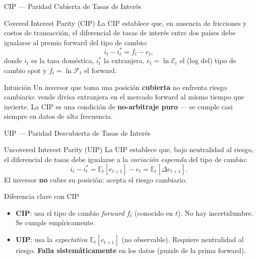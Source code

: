 
\begin{frame}{CIP — Paridad Cubierta de Tasas de Interés}

  \begin{bluebox}{Covered Interest Parity (CIP)}
    La CIP establece que, en ausencia de fricciones y costos de transacción, el
    diferencial de tasas de interés entre dos países debe igualarse al premio forward
    del tipo de cambio:
    \[
      i_t - i^*_t = f_t - e_t,
    \]
    donde $i_t$ es la tasa doméstica, $i^*_t$ la extranjera, $e_t = \ln \mathcal{E}_t$
    el (log del) tipo de cambio spot y $f_t = \ln \mathcal{F}_t$ el forward.
  \end{bluebox}

  \bigskip
  \begin{block}{Intuición}
    Un inversor que toma una posición \textbf{cubierta} no enfrenta riesgo cambiario:
    vende divisa extranjera en el mercado forward al mismo tiempo que invierte.
    La CIP es una condición de \textbf{no-arbitraje puro} — se cumple casi siempre
    en datos de alta frecuencia.
  \end{block}

\end{frame}


\begin{frame}{UIP — Paridad Descubierta de Tasas de Interés}

  \begin{bluebox}{Uncovered Interest Parity (UIP)}
    La UIP establece que, bajo neutralidad al riesgo, el diferencial de tasas debe
    igualarse a la \emph{variación esperada} del tipo de cambio:
    \[
      i_t - i^*_t = \mathbb{E}_t[e_{t+1}] - e_t = \mathbb{E}_t[\Delta e_{t+1}].
    \]
    El inversor \textbf{no} cubre su posición: acepta el riesgo cambiario.
  \end{bluebox}

  \bigskip
  \begin{block}{Diferencia clave con CIP}
    \begin{itemize}
      \item \textbf{CIP}: usa el tipo de cambio \emph{forward} $f_t$ (conocido en $t$).
            No hay incertidumbre. Se cumple empíricamente.
      \item \textbf{UIP}: usa la \emph{expectativa} $\mathbb{E}_t[e_{t+1}]$ (no observable).
            Requiere neutralidad al riesgo. \textbf{Falla sistemáticamente} en los datos
            (puzzle de la prima forward).
    \end{itemize}
  \end{block}

\end{frame}

